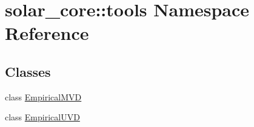 \hypertarget{namespacesolar__core_1_1tools}{}\section{solar\+\_\+core\+:\+:tools Namespace Reference}
\label{namespacesolar__core_1_1tools}
\subsection*{Classes}
\begin{DoxyCompactItemize}
\item 
class \hyperlink{classsolar__core_1_1tools_1_1_empirical_m_v_d}{Empirical\+M\+V\+D}
\item 
class \hyperlink{classsolar__core_1_1tools_1_1_empirical_u_v_d}{Empirical\+U\+V\+D}
\end{DoxyCompactItemize}
